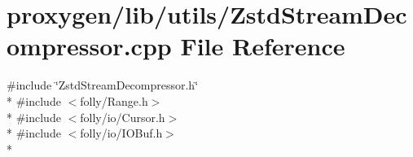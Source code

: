 \section{proxygen/lib/utils/\+Zstd\+Stream\+Decompressor.cpp File Reference}
\label{ZstdStreamDecompressor_8cpp}
{\ttfamily \#include \char`\"{}Zstd\+Stream\+Decompressor.\+h\char`\"{}}\\*
{\ttfamily \#include $<$folly/\+Range.\+h$>$}\\*
{\ttfamily \#include $<$folly/io/\+Cursor.\+h$>$}\\*
{\ttfamily \#include $<$folly/io/\+I\+O\+Buf.\+h$>$}\\*
